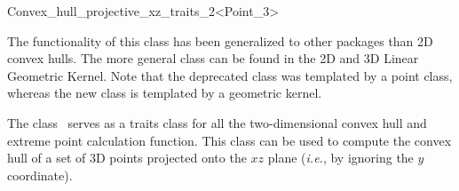 
\ccAutoIndexingOff
\begin{ccRefClass}{Convex_hull_projective_xz_traits_2<Point_3>}
\ccAutoIndexingOn
{}


The functionality of this class has been generalized to other packages than 2D convex hulls.
The more general class  can be found in the 2D and 3D Linear Geometric Kernel.
Note that the deprecated class was templated by a point class, whereas the new class
is templated by a geometric kernel.

\begin{ccDeprecated}
\ccDefinition
  
The class \ccRefName\ serves as a traits class for all the two-dimensional
convex hull and extreme point calculation function.   This class can be
used to compute the convex hull of a set of 3D points projected onto the
$xz$ plane (\textit{i.e.}, by ignoring the $y$ coordinate).


\ccIsModel

%
 \\

\ccTypes
\ccAutoIndexingOff
{}
\ccThreeToTwo

\ccGlue
{}
\ccGlue
{}
\ccGlue
{}
\ccGlue
{}
\ccGlue
{}
\ccGlue
{}

\ccCreation
{}  %


\end{ccDeprecated}
\end{ccRefClass}
